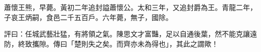 \begin{pinyinscope}
 
 
 蕭懷王熊，早薨。黃初二年追封謚蕭懷公。太和三年，又追封爵為王。青龍二年，子哀王炳嗣，食邑二千五百戶。六年薨，無子，國除。
 
 
 
 
 評曰：任城武藝壯猛，有將領之氣。陳思文才富豔，足以自通後葉，然不能克讓遠防，終致攜隙。傳曰「楚則失之矣。而齊亦未為得也」，其此之謂歟！
 
 
 
 
\end{pinyinscope}